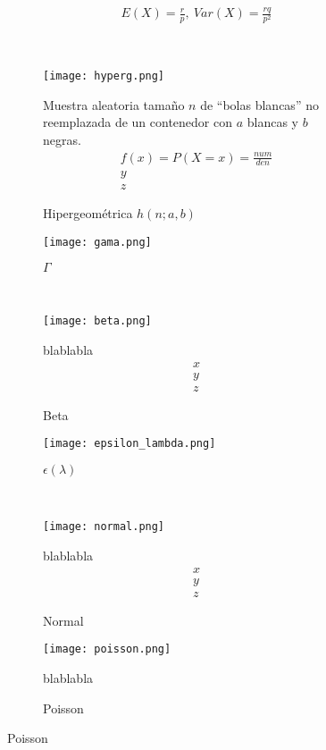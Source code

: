 \begin{figure}[H]
\begin{subfigure}[t]{.5\textwidth}
\begin{equation}
\begin{matrix}
		E(X)=\frac{r}{p},\ Var(X)=\frac{rq}{p^2}
		\end{matrix}
		\end{equation}
	\end{subfigure}\ \ \ \ 
\begin{subfigure}[t]{.5\textwidth}
		\texttt{[image: hyperg.png]}\caption{Hipergeométrica $h(n;a,b)$}
		Muestra aleatoria tamaño $n$ de ``bolas blancas'' no reemplazada de un contenedor con $a$ blancas y $b$ negras.
		\begin{equation}
		\begin{matrix}
		f(x)=P(X=x)=\frac{num}{den}\\
		y\\
		z
		\end{matrix}
		\end{equation}
	\end{subfigure}	
	\begin{subfigure}[t]{.5\textwidth}
		\texttt{[image: gama.png]}
		\caption{$\Gamma$}
	\end{subfigure}\ \ \ \ 
\begin{subfigure}[t]{.5\textwidth}\centering
		\texttt{[image: beta.png]}\caption{Beta}
		blablabla
		\begin{equation}
		\begin{matrix}
		x\\
		y\\
		z
		\end{matrix}
		\end{equation}
	\end{subfigure}	
	\begin{subfigure}[t]{.5\textwidth}
		\texttt{[image: epsilon\_lambda.png]}
		\caption{$\epsilon(\lambda)$}
	\end{subfigure}\ \ \ \ 
\begin{subfigure}[t]{.5\textwidth}
		\texttt{[image: normal.png]}\caption{Normal}
		blablabla
		\begin{equation}
		\begin{matrix}
		x\\
		y\\
		z
		\end{matrix}
		\end{equation}
	\end{subfigure}	
	\begin{subfigure}[t]{.5\textwidth}
		\texttt{[image: poisson.png]}\caption{Poisson}
		blablabla
		\begin{equation}

\end{equation}
\end{subfigure}
\end{figure}
